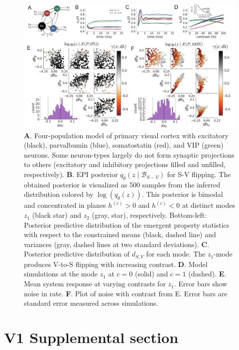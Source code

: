\documentclass[11pt]{article}
\begin{document}
\clearpage
\begin{figure}[h]
\caption{\small \textbf{A}.  Four-population model of primary visual cortex with excitatory (black), parvalbumin (blue), somatostatin (red), and VIP (green) neurons.   Some neuron-types largely do not form synaptic projections to others  (excitatory and inhibitory projections filled and unfilled, respectively).
\textbf{B}. EPI posterior $q_\theta(z \mid \mathcal{B}_{S-V})$ for S-V flipping. The obtained posterior is visualized as 500 samples from the inferred distribution colored by $\log(q_\theta(z))$. This posterior is bimodal and concentrated in planes $h^{(c)} > 0$ and $h^{(c)} < 0$ at distinct modes $z_1$ (black star) and $z_2$ (gray, star), respectively.  Bottom-left: Posterior predictive distribution of the emergent property statistics with respect to the constrained means (black, dashed line) and variances (gray, dashed lines at two standard deviations). 
\textbf{C}. Posterior predictive distribution of $d_{S,V}$ for each mode.  The $z_1$-mode produces V-to-S flipping with increasing contrast.
\textbf{D}. Model simulations at the mode $z_1$ at $c=0$ (solid) and $c=1$ (dashed). \textbf{E}. Mean system response at varying contrasts for $z_1$. Error bars show noise in rate. \textbf{F}. Plot of noise with contrast from E. Error bars are standard error measured across simulations.
 }\label{fig:Fig3}
\begin{center}
\includegraphics[scale=.18]{figs/Fig3/Fig3.pdf}
\end{center}
\end{figure}
\clearpage




\section{V1 Supplemental section}\label{methods_V1}
\end{document}
